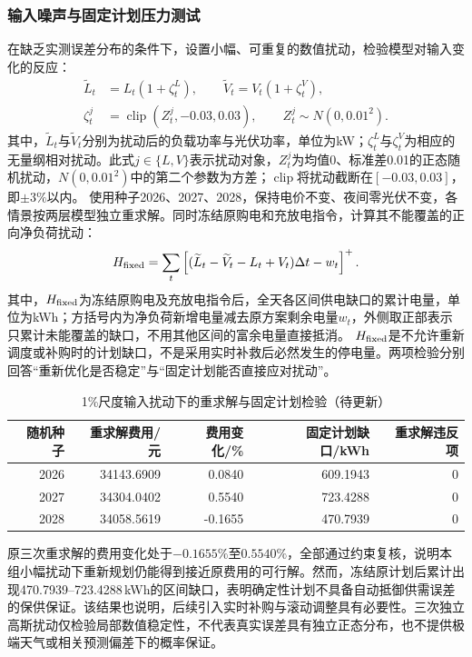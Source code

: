 \documentclass[withoutpreface,bwprint]{cumcmthesis}
\begin{document}
\subsubsection{输入噪声与固定计划压力测试}
在缺乏实测误差分布的条件下，设置小幅、可重复的数值扰动，检验模型对输入变化的反应：
\begin{equation}
 \begin{aligned}
 \widetilde L_t&=L_t(1+\zeta_t^L),\qquad
 \widetilde V_t=V_t(1+\zeta_t^V),\\
 \zeta_t^j&=\operatorname{clip}(Z_t^j,-0.03,0.03),\qquad
 Z_t^j\sim N(0,0.01^2).
 \end{aligned}
 \label{eq:q1-noise}
\end{equation}
其中，$\widetilde L_t$与$\widetilde V_t$分别为扰动后的负载功率与光伏功率，单位为kW；$\zeta_t^L$与$\zeta_t^V$为相应的无量纲相对扰动。此式$j\in\{L,V\}$表示扰动对象，$Z_t^j$为均值0、标准差0.01的正态随机扰动，$N(0,0.01^2)$中的第二个参数为方差；$\operatorname{clip}$将扰动截断在$[-0.03,0.03]$，即$\pm3\%$以内。
使用种子2026、2027、2028，保持电价不变、夜间零光伏不变，各情景按两层模型独立重求解。同时冻结原购电和充放电指令，计算其不能覆盖的正向净负荷扰动：
\begin{equation}
 H_{\rm fixed}
 =\sum_t\left[
  (\widetilde L_t-\widetilde V_t-L_t+V_t)\Delta t-w_t
 \right]^+ .
 \label{eq:q1-fixed-test}
\end{equation}
其中，$H_{\rm fixed}$为冻结原购电及充放电指令后，全天各区间供电缺口的累计电量，单位为kWh；方括号内为净负荷新增电量减去原方案剩余电量$w_t$，外侧取正部表示只累计未能覆盖的缺口，不用其他区间的富余电量直接抵消。
$H_{\rm fixed}$是不允许重新调度或补购时的计划缺口，不是采用实时补救后必然发生的停电量。两项检验分别回答“重新优化是否稳定”与“固定计划能否直接应对扰动”。

\begin{table}[H]
 \centering\small
 \caption{1\%尺度输入扰动下的重求解与固定计划检验（待更新）}\label{tab:q1-noise}
 \begin{tabular}{rrrrr}
 \toprule
 随机种子&重求解费用/元&费用变化/\%&固定计划缺口/kWh&重求解违反项\\
 \midrule
2026&34143.6909&0.0840&609.1943&0\\
2027&34304.0402&0.5540&723.4288&0\\
2028&34058.5619&-0.1655&470.7939&0\\
 \bottomrule
 \end{tabular}
\end{table}

原三次重求解的费用变化处于$-0.1655\%$至$0.5540\%$，全部通过约束复核，说明本组小幅扰动下重新规划仍能得到接近原费用的可行解。然而，冻结原计划后累计出现470.7939--723.4288\,kWh的区间缺口，表明确定性计划不具备自动抵御供需误差的保供保证。该结果也说明，后续引入实时补购与滚动调整具有必要性。三次独立高斯扰动仅检验局部数值稳定性，不代表真实误差具有独立正态分布，也不提供极端天气或相关预测偏差下的概率保证。
\end{document}
